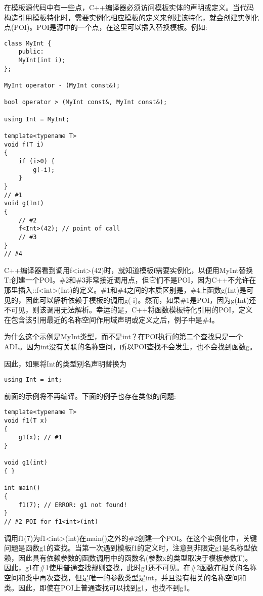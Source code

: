
在模板源代码中有一些点，C++编译器必须访问模板实体的声明或定义。当代码构造引用模板特化时，需要实例化相应模板的定义来创建该特化，就会创建实例化点(POI)。POI是源中的一个点，在这里可以插入替换模板。例如:

\begin{lstlisting}[style=styleCXX]
class MyInt {
	public:
	MyInt(int i);
};

MyInt operator - (MyInt const&);

bool operator > (MyInt const&, MyInt const&);

using Int = MyInt;

template<typename T>
void f(T i)
{
	if (i>0) {
		g(-i);
	}
}
// #1
void g(Int)
{
	// #2
	f<Int>(42); // point of call
	// #3
}
// #4
\end{lstlisting}

C++编译器看到调用f<int>(42)时，就知道模板f需要实例化，以便用MyInt替换T:创建一个POI。\#2和\#3非常接近调用点，但它们不是POI，因为C++不允许在那里插入::f<int>(Int)的定义。\#1和\#4之间的本质区别是，\#4上函数g(Int)是可见的，因此可以解析依赖于模板的调用g(-i)。然而，如果\#1是POI，因为g(Int)还不可见，则该调用无法解析。幸运的是，C++将函数模板特化引用的POI，定义在包含该引用最近的名称空间作用域声明或定义之后，例子中是\#4。

为什么这个示例是MyInt类型，而不是int？在POI执行的第二个查找只是一个ADL。因为int没有关联的名称空间，所以POI查找不会发生，也不会找到函数g。

因此，如果将Int的类型别名声明替换为

\begin{lstlisting}[style=styleCXX]
using Int = int;
\end{lstlisting}

前面的示例将不再编译。下面的例子也存在类似的问题:

\begin{lstlisting}[style=styleCXX]
template<typename T>
void f1(T x)
{
	g1(x); // #1
}

void g1(int)
{ }

int main()
{
	f1(7); // ERROR: g1 not found!
}
// #2 POI for f1<int>(int)
\end{lstlisting}

调用f1(7)为f1<int>(int)在main()之外的\#2创建一个POI。在这个实例化中，关键问题是函数g1的查找。当第一次遇到模板f1的定义时，注意到非限定g1是名称型依赖，因此具有依赖参数的函数调用中的函数名(参数x的类型取决于模板参数T)。因此，g1在\#1使用普通查找规则查找，此时g1还不可见。在\#2函数在相关的名称空间和类中再次查找，但是唯一的参数类型是int，并且没有相关的名称空间和类。因此，即使在POI上普通查找可以找到g1，也找不到g1。

